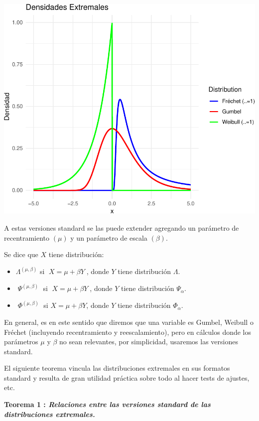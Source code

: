 \documentclass[
]{book}
\theoremstyle{definition}
\theoremstyle{definition}
\theoremstyle{definition}
\theoremstyle{definition}
\theoremstyle{remark}
\begin{document}
\includegraphics{_main_files/figure-latex/plot-extreme-distributions-1.pdf}

A estas versiones standard se las puede extender
agregando un parámetro de recentramiento \((\mu)\) y
un parámetro de escala \((\beta)\).

Se dice que \(X\) tiene distribución:

\begin{itemize}
\item
  \(\Lambda^{(\mu, \beta)}\) si \(\;X=\mu + \beta Y\;\), donde \(Y\) tiene distribución \(\Lambda\).
\item
  \(\;\Psi^{(\mu, \beta)}\;\) si \(\;X=\mu + \beta Y\;\), donde \(Y\) tiene distribución \(\Psi_{\alpha}\).
\item
  \(\;\Phi^{(\mu, \beta)}\;\) si \(X=\mu + \beta Y\), donde \(Y\) tiene distribución \(\Phi_{\alpha}\).
\end{itemize}

En general, es en este sentido que diremos que una
variable es Gumbel, Weibull o Fréchet (incluyendo
recentramiento y reescalamiento), pero en cálculos
donde los parámetros \(\mu\) y \(\beta\) no sean relevantes, por
simplicidad, usaremos las versiones standard.

El siguiente teorema vincula las distribuciones
extremales en sus formatos standard y resulta de
gran utilidad práctica sobre todo al hacer tests de
ajustes, etc.

\textbf{Teorema 1 : \emph{Relaciones entre las versiones
standard de las distribuciones extremales.}}
\end{document}
